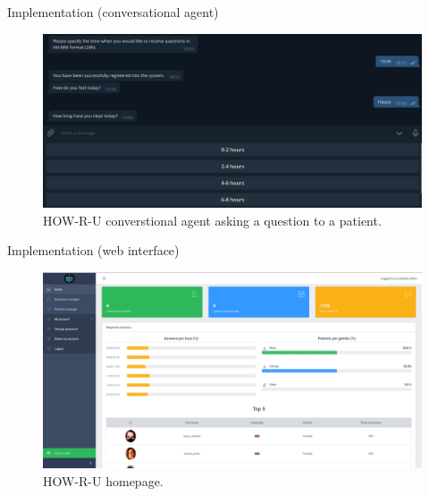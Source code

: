 \documentclass{beamer}
\begin{document}
\begin{frame}[fragile]{Implementation (conversational agent)}
  \begin{figure}[H]
    \centering
      \includegraphics[width=\textwidth]{bot_answering.png}
    \caption{HOW-R-U converstional agent asking a question to a patient.}
  \end{figure}
\end{frame}

\begin{frame}[fragile]{Implementation (web interface)}
  \begin{figure}[H]
      \centering
      \includegraphics[width=\textwidth]{homepage.png}
      \caption{HOW-R-U homepage.}
  \end{figure}
\end{frame}
\end{document}
